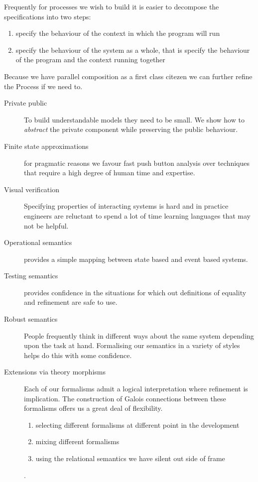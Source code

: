 \documentclass[]{article}
\begin{document}
Frequently for processes we wish to build it is easier to decompose the specifications into two steps:
\begin{enumerate}
\item specify the behaviour of the context in which the program will run
\item specify the behaviour of the system as a whole, that is specify the behaviour of the program and the context running together
\end{enumerate}



Because we have parallel composition as a first class citezen  we can further refine the Process if we need to.

{\color{red}
\begin{description}
\item[Private public] To build understandable models they need to be small. We show how to \emph{abstract} the private component while preserving the public behaviour.
\item[Finite state approximations] for pragmatic reasons we favour fast push button analysis over techniques that require a high degree of human time and expertise.
\item[Visual verification] Specifying properties of interacting systems  is hard and in practice engineers  are reluctant to spend a lot of time learning languages that may not be helpful.
\item[Operational semantics] provides a simple mapping between state based and event based systems.
\item[Testing semantics] provides confidence in the situations for which  out definitions of equality and refinement are safe to use.

\item[Robust semantics] People frequently think in different ways about the same system depending upon the task at hand.  Formalising our semantics in a variety of styles  helps do this with some confidence.

\item [Extensions via theory morphisms] Each of our formalisms admit  a logical interpretation where refinement is implication. The construction of Galois connections between these formalisms offers us a great deal of flexibility.  \begin{enumerate}
\item  selecting different formalisms at different point in the development
\item  mixing different formalisms
\item  using the relational semantics we have silent out side of frame
\end{enumerate}.


\end{description}}
\end{document}
